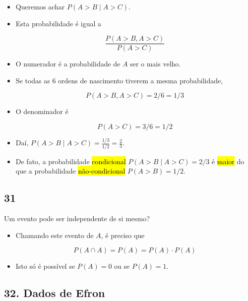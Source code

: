 \documentclass[
  11pt]{report}
\begin{document}
\begin{itemize}
\item
  Queremos achar $P(A > B \mid A > C)$.
\item
  Esta probabilidade é igual a

  \[
  \frac{P(A > B,  A > C)}{P(A > C)}
  \]
\item
  O numerador é a probabilidade de $A$ ser o mais velho.
\item
  Se todas as $6$ ordens de nascimento tiverem a mesma probabilidade,

  \[
  P(A > B,  A > C) = 2/6 = 1/3
  \]
\item
  O denominador é

  \[
  P(A > C) = 3/6 = 1/2
  \]
\item
  Daí, $P(A > B \mid A > C) = \frac{1/3}{1/2} = \frac23$.
\item
  De fato, a probabilidade {\hl{condicional}} $P(A > B \mid A > C) = 2/3$ é {\hl{maior}} do que a probabilidade {\hl{não-condicional}} $P(A > B) = 1/2$.
\end{itemize}

\hypertarget{section-18}{%
\subsection*{31}\label{section-18}}

\begin{rmdbox}
Um evento pode ser independente de si mesmo?

\end{rmdbox}

\begin{itemize}
\item
  Chamando este evento de $A$, é preciso que

  \[
  P(A \cap A) = P(A) = P(A) \cdot P(A)
  \]
\item
  Isto só é possível se $P(A) = 0$ ou se $P(A) = 1$.
\end{itemize}

\hypertarget{dados-de-efron}{%
\subsection*{32. Dados de Efron}\label{dados-de-efron}}
\end{document}
